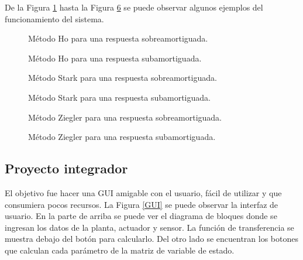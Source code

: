\documentclass[journal]{IEEEtran}
\begin{document}
De la Figura \ref{fig1} hasta la Figura \ref{fig6} se puede 
observar algunos ejemplos del funcionamiento del sistema. 

\begin{figure}[H]
\label{fig1}
\caption{Método Ho para una respuesta sobreamortiguada.}
\end{figure}

\begin{figure}[H]
\label{fig2}
\caption{Método Ho para una respuesta subamortiguada.}
\end{figure}


\begin{figure}[H]
\label{fig3}
\caption{Método Stark para una respuesta sobreamortiguada.}
\end{figure}

\begin{figure}[H]
\label{fig4}
\caption{Método Stark para una respuesta subamortiguada.}
\end{figure}

\begin{figure}[H]
\label{fig5}
\caption{Método Ziegler para una respuesta sobreamortiguada.}
\end{figure}

\begin{figure}[H]
\label{fig6}
\caption{Método Ziegler para una respuesta subamortiguada.}
\end{figure}


\newpage
\subsection*{Proyecto integrador}
El objetivo fue hacer una GUI amigable con el usuario, 
fácil de utilizar y que consumiera pocos recursos. La Figura 
\ref{GUI} se puede observar la interfaz de usuario. En la parte de arriba se puede ver el diagrama de bloques donde se ingresan los datos de la planta, actuador y sensor. La función de transferencia se muestra debajo del botón para calcularlo. Del otro lado se encuentran los botones que calculan cada parámetro de la matriz de variable de estado.\\
\end{document}
